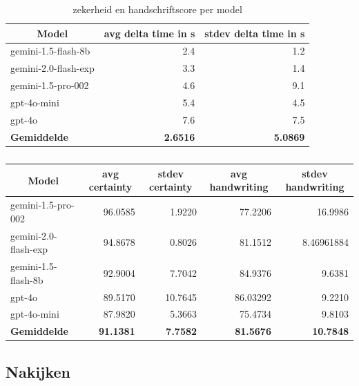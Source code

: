 \documentclass[12pt]{article}
\begin{document}
\noindent\begin{table}[H]
\caption{zekerheid en handschriftscore per model} 
\label{fig:time-model} 
\begin{tabularx}{\textwidth}{X *2{r}}
    \toprule
    \multicolumn{1}{c}{\textbf{Model}} & \multicolumn{1}{c}{\textbf{avg delta time in s}} & \multicolumn{1}{c}{\textbf{stdev delta time in s}} \\
    \midrule
    gemini-1.5-flash-8b & 2.4 & 1.2 \\
    gemini-2.0-flash-exp & 3.3 & 1.4 \\
    gemini-1.5-pro-002 & 4.6 & 9.1 \\
    gpt-4o-mini & 5.4 & 4.5 \\
    gpt-4o & 7.6 & 7.5 \\
    \midrule
    \textbf{Gemiddelde} & \textbf{2.6516} & \textbf{5.0869} \\
    \bottomrule
\end{tabularx}%
\end{table}

\noindent\begin{table}[H]
\caption{}
\label{fig:certainty-model}
\begin{tabularx}{\textwidth}{X *4{r}}
    \toprule
    \multicolumn{1}{c}{\textbf{Model}} & \multicolumn{1}{c}{\textbf{avg  certainty}} & \multicolumn{1}{c}{\textbf{stdev certainty}} & \multicolumn{1}{c}{\textbf{avg handwriting}} & \multicolumn{1}{c}{\textbf{stdev handwriting}} \\
    \midrule
    gemini-1.5-pro-002 & 96.0585 & 1.9220 & 77.2206 & 16.9986 \\
    gemini-2.0-flash-exp & 94.8678 & 0.8026 & 81.1512 & 8.46961884 \\
    gemini-1.5-flash-8b & 92.9004 & 7.7042 & 84.9376 & 9.6381 \\
    gpt-4o & 89.5170 & 10.7645 & 86.03292 & 9.2210 \\
    gpt-4o-mini & 87.9820 & 5.3663 & 75.4734 & 9.8103 \\
    \midrule
    \textbf{Gemiddelde} & \textbf{91.1381} & \textbf{7.7582} & \textbf{81.5676} & \textbf{10.7848} \\
    \bottomrule
\end{tabularx}%
\end{table}

\pagebreak
\subsection{Nakijken}
\end{document}
